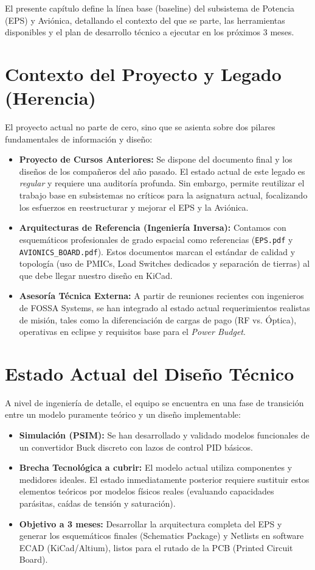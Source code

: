 
\noindent El presente capítulo define la línea base (baseline) del subsistema de Potencia (EPS) y Aviónica, detallando el contexto del que se parte, las herramientas disponibles y el plan de desarrollo técnico a ejecutar en los próximos 3 meses.

\section{Contexto del Proyecto y Legado (Herencia)}
\noindent El proyecto actual no parte de cero, sino que se asienta sobre dos pilares fundamentales de información y diseño:
\begin{itemize}
    \item \textbf{Proyecto de Cursos Anteriores:} Se dispone del documento final y los diseños de los compañeros del año pasado. El estado actual de este legado es \textit{regular} y requiere una auditoría profunda. Sin embargo, permite reutilizar el trabajo base en subsistemas no críticos para la asignatura actual, focalizando los esfuerzos en reestructurar y mejorar el EPS y la Aviónica.
    \item \textbf{Arquitecturas de Referencia (Ingeniería Inversa):} Contamos con esquemáticos profesionales de grado espacial como referencias (\texttt{EPS.pdf} y \texttt{AVIONICS\_BOARD.pdf}). Estos documentos marcan el estándar de calidad y topología (uso de PMICs, Load Switches dedicados y separación de tierras) al que debe llegar nuestro diseño en KiCad.
    \item \textbf{Asesoría Técnica Externa:} A partir de reuniones recientes con ingenieros de FOSSA Systems, se han integrado al estado actual requerimientos realistas de misión, tales como la diferenciación de cargas de pago (RF vs. Óptica), operativas en eclipse y requisitos base para el \textit{Power Budget}.
\end{itemize}

\section{Estado Actual del Diseño Técnico}
A nivel de ingeniería de detalle, el equipo se encuentra en una fase de transición entre un modelo puramente teórico y un diseño implementable:
\begin{itemize}
    \item \textbf{Simulación (PSIM):} Se han desarrollado y validado modelos funcionales de un convertidor Buck discreto con lazos de control PID básicos.
    \item \textbf{Brecha Tecnológica a cubrir:} El modelo actual utiliza componentes y medidores ideales. El estado inmediatamente posterior requiere sustituir estos elementos teóricos por modelos físicos reales (evaluando capacidades parásitas, caídas de tensión y saturación).
    \item \textbf{Objetivo a 3 meses:} Desarrollar la arquitectura completa del EPS y generar los esquemáticos finales (Schematics Package) y Netlists en software ECAD (KiCad/Altium), listos para el rutado de la PCB (Printed Circuit Board).
\end{itemize}

